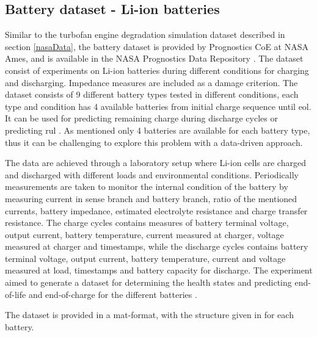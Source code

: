 \documentclass[english, a4paper]{report}
\begin{document}
{{        \subsection{Battery dataset - Li-ion batteries}\label{batteryDataset}
        {
            Similar to the turbofan engine degradation simulation dataset described in section \ref{nasaData}, the battery dataset is provided by Prognostics CoE at NASA Ames, and is available in the NASA Prognostics Data Repository \cite{nasaBatteryData}. The dataset consist of experiments on Li-ion batteries during different conditions for charging and discharging. Impedance measures are included as a damage criterion. The dataset consists of 9 different battery types tested in different conditions, each type and condition has 4 available batteries from initial charge sequence until \gls{eol}. It can be used for predicting remaining charge during discharge cycles or predicting \gls{rul} \cite{nasaBatteryPrognostics}. As mentioned only 4 batteries are available for each battery type, thus it can be challenging to explore this problem with a data-driven approach.
            \par
            The data are achieved through a laboratory setup where Li-ion cells are charged and discharged with different loads and environmental conditions. Periodically measurements are taken to monitor the internal condition of the battery by measuring current in sense branch and battery branch, ratio of the mentioned currents, battery impedance, estimated electrolyte resistance and charge transfer resistance. The charge cycles contains measures of battery terminal voltage, output current, battery temperature, current measured at charger, voltage measured at charger and timestamps, while the discharge cycles contains battery terminal voltage, output current, battery temperature, current and voltage measured at load, timestamps and battery capacity for discharge. The experiment aimed to generate a dataset for determining the health states and predicting end-of-life and end-of-charge for the different batteries \cite{nasaBatteryPrognostics}. 
            \par 
            The dataset is provided in a mat-format, with the structure given in  for each battery.
            
}}}
\end{document}
